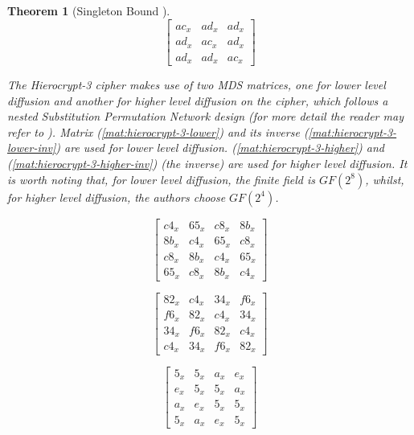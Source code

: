 \documentclass{report}
\newtheorem{theorem}{Theorem}{\bfseries}{\itshape}
\begin{document}
\begin{theorem}[Singleton Bound \cite{SloaneBook}]
\begin{equation}\label{mat:bksq-inv}
\begin{bmatrix}
ac_x & ad_x & ad_x\\
ad_x & ac_x & ad_x\\
ad_x & ad_x & ac_x
\end{bmatrix}
\end{equation}

The Hierocrypt-3 cipher makes use of two MDS matrices, one for lower level diffusion and another for higher level diffusion on the cipher, which follows a nested Substitution Permutation Network design (for more detail the reader may refer to \cite{Hierocrypt2000}). Matrix (\ref{mat:hierocrypt-3-lower}) and its inverse (\ref{mat:hierocrypt-3-lower-inv}) are used for lower level diffusion. (\ref{mat:hierocrypt-3-higher}) and (\ref{mat:hierocrypt-3-higher-inv}) (the inverse) are used for higher level diffusion. It is worth noting that, for lower level diffusion, the finite field is $GF(2^8)$, whilst, for higher level diffusion, the authors choose $GF(2^4)$.

\begin{equation}\label{mat:hierocrypt-3-lower}
\begin{bmatrix}
c4_x & 65_x & c8_x & 8b_x\\
8b_x & c4_x & 65_x & c8_x\\
c8_x & 8b_x & c4_x & 65_x\\
65_x & c8_x & 8b_x & c4_x
\end{bmatrix}
\end{equation}

\begin{equation}\label{mat:hierocrypt-3-lower-inv}
\begin{bmatrix}
82_x & c4_x & 34_x & f6_x\\
f6_x & 82_x & c4_x & 34_x\\
34_x & f6_x & 82_x & c4_x\\
c4_x & 34_x & f6_x & 82_x
\end{bmatrix}
\end{equation}

\begin{equation}\label{mat:hierocrypt-3-higher}
\begin{bmatrix}
5_x & 5_x & a_x & e_x\\
e_x & 5_x & 5_x & a_x\\
a_x & e_x & 5_x & 5_x\\
5_x & a_x & e_x & 5_x
\end{bmatrix}
\end{equation}


\end{theorem}
\end{document}

